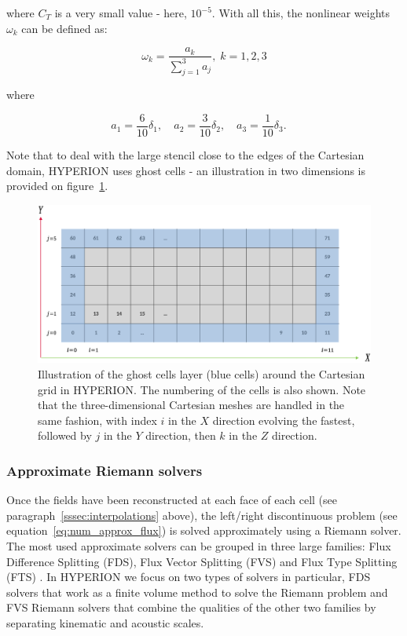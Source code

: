 where $C_T$ is a very small value - here, $10^{-5}$.
With all this, the nonlinear weights $\omega_k$ can be defined as:

\begin{equation}
  \omega_k = \dfrac {a_k} {\sum_{j=1}^3 a_j },\; k = 1,2,3
\end{equation}

where

\begin{equation}
    a_1 = \dfrac{6}{10}\delta_1,\quad
    a_2 = \dfrac{3}{10}\delta_2,\quad
    a_3 = \dfrac{1}{10}\delta_3.\quad
\end{equation}

Note that to deal with the large stencil close to the edges of the Cartesian domain, HYPERION uses ghost cells - an illustration in two dimensions is provided on figure~\ref{fig:ghost_cells}.

\begin{figure}[ht!]
    \centering
    \includegraphics[width=0.75\linewidth]{chapter3_numerical_methods/pictures/grid_ghost_2.png}
    \caption{
        Illustration of the ghost cells layer (blue cells) around the Cartesian grid in HYPERION.
        The numbering of the cells is also shown.
        Note that the three-dimensional Cartesian meshes are handled in the same fashion, with index $i$ in the $X$ direction evolving the fastest, followed by $j$ in the $Y$ direction, then $k$ in the $Z$ direction.
    }
    \label{fig:ghost_cells}
\end{figure}

\subsubsection{Approximate Riemann solvers}\label{sssec:ars}

Once the fields have been reconstructed at each face of each cell (see paragraph~\ref{sssec:interpolations} above), the left/right discontinuous problem (see equation~\eqref{eq:num_approx_flux}) is solved approximately using a Riemann solver.
The most used approximate solvers can be grouped in three large families: Flux Difference Splitting (FDS), Flux Vector Splitting (FVS) and Flux Type Splitting (FTS) \cite{toro2013riemann,qu2021review}.
In HYPERION we focus on two types of solvers in particular, FDS solvers that work as a finite volume method to solve the Riemann problem and FVS Riemann solvers that combine the qualities of the other two families by separating kinematic and acoustic scales.

